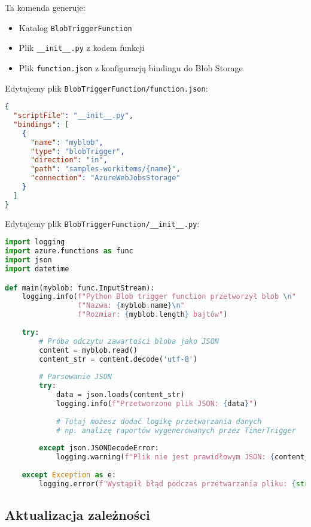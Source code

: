 \documentclass{article}
\begin{document}
Ta komenda generuje:
\begin{itemize}
    \item Katalog \texttt{BlobTriggerFunction}
    \item Plik \texttt{\_\_init\_\_.py} z kodem funkcji
    \item Plik \texttt{function.json} z konfiguracją bindingu do Blob Storage
\end{itemize}

Edytujemy plik \texttt{BlobTriggerFunction/function.json}:

\begin{lstlisting}[language=json]
{
  "scriptFile": "__init__.py",
  "bindings": [
    {
      "name": "myblob",
      "type": "blobTrigger",
      "direction": "in",
      "path": "samples-workitems/{name}",
      "connection": "AzureWebJobsStorage"
    }
  ]
}
\end{lstlisting}

Edytujemy plik \texttt{BlobTriggerFunction/\_\_init\_\_.py}:

\begin{lstlisting}[language=Python]
import logging
import azure.functions as func
import json
import datetime

def main(myblob: func.InputStream):
    logging.info(f"Python Blob trigger function przetworzył blob \n"
                 f"Nazwa: {myblob.name}\n"
                 f"Rozmiar: {myblob.length} bajtów")
    
    try:
        # Próba odczytu zawartości bloba jako JSON
        content = myblob.read()
        content_str = content.decode('utf-8')
        
        # Parsowanie JSON
        try:
            data = json.loads(content_str)
            logging.info(f"Przetworzono plik JSON: {data}")
            
            # Tutaj możesz dodać logikę przetwarzania danych
            # np. analizę raportów wygenerowanych przez TimerTrigger
            
        except json.JSONDecodeError:
            logging.warning(f"Plik nie jest prawidłowym JSON: {content_str[:100]}...")
            
    except Exception as e:
        logging.error(f"Wystąpił błąd podczas przetwarzania pliku: {str(e)}")
\end{lstlisting}

\subsection{Aktualizacja zależności}
\end{document}
